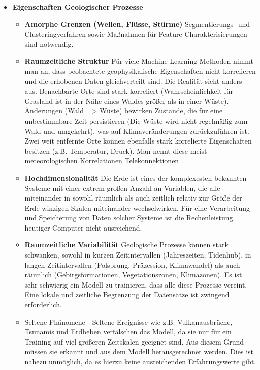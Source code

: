 \documentclass[11pt,fleqn]{book}
\begin{document}
\begin{itemize}
\item \textbf{Eigenschaften Geologischer Prozesse}
\begin{itemize}\item \textbf{Amorphe Grenzen (Wellen, Flüsse, Stürme)} Segmentierungs- und Clusteringverfahren sowie Maßnahmen für Feature-Charakterisierungen sind notwendig.
\item \textbf{Raumzeitliche Struktur}  
Für viele Machine Learning Methoden nimmt man an, dass beobachtete geophysikalische Eigenschaften nicht korrelieren und die erhobenen Daten gleichverteilt sind. Die Realität sieht anders aus. 
Benachbarte Orte sind stark korreliert (Wahrscheinlichkeit für Grasland ist in der Nähe eines Waldes größer als in einer Wüste). Änderungen (Wald => Wüste) bewirken Zustände, die für eine unbestimmbare Zeit persistieren (Die Wüste wird nicht regelmäßig zum Wald und umgekehrt), was auf Klimaveränderungen zurückzuführen ist.
Zwei weit entfernte Orte können ebenfalls stark korrelierte Eigenschaften besitzen (z.B. Temperatur, Druck). Man nennt diese meist meteorologischen Korrelationen Telekonnektionen .
\item \textbf{Hochdimensionalität} Die Erde ist eines der komplexesten bekannten Systeme mit einer extrem großen Anzahl an Variablen, die alle miteinander in sowohl räumlich als auch zeitlich relativ zur Größe der Erde winzigen Skalen miteinander wechselwirken. Für eine Verarbeitung und Speicherung von Daten solcher Systeme ist die Rechenleistung heutiger Computer nicht ausreichend.
\item \textbf{Raumzeitliche Variabilität} Geologische Prozesse können stark schwanken, sowohl in kurzen Zeitintervallen (Jahreszeiten, Tidenhub), in langen Zeitintervallen (Polsprung, Präzession, Klimawandel) als auch räumlich (Gebirgsformationen, Vegetationszonen, Klimazonen). Es ist sehr schwierig ein Modell zu trainieren, dass alle diese Prozesse vereint. Eine lokale und zeitliche Begrenzung der Datensätze ist zwingend erforderlich.
\item Seltene Phänomene - Seltene Ereignisse wie z.B. Vulkanausbrüche, Tsunamis und Erdbeben verfälschen das Modell, da sie nur für ein Training auf viel größeren Zeitskalen geeignet sind. Aus diesem Grund müssen sie erkannt und aus dem Modell herausgerechnet werden. Dies ist nahezu unmöglich, da es hierzu keine ausreichenden Erfahrungswerte gibt.
\end{itemize}


\end{itemize}
\end{document}
